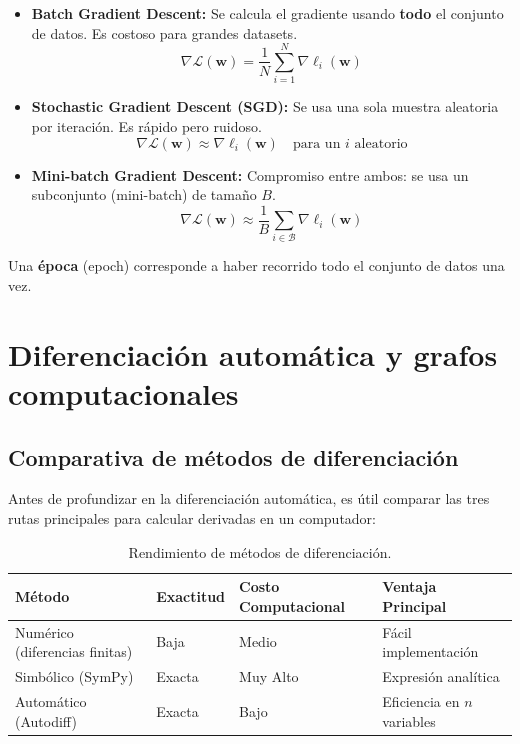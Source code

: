 \documentclass[12pt,a4paper,openany,oneside]{book}
\begin{document}
\begin{itemize}
    \item \textbf{Batch Gradient Descent:} Se calcula el gradiente usando \textbf{todo} el conjunto de datos. Es costoso para grandes datasets.
    \[
    \nabla \mathcal{L}(\mathbf{w}) = \frac{1}{N} \sum_{i=1}^{N} \nabla \ell_i(\mathbf{w})
    \]
    \item \textbf{Stochastic Gradient Descent (SGD):} Se usa una sola muestra aleatoria por iteración. Es rápido pero ruidoso.
    \[
    \nabla \mathcal{L}(\mathbf{w}) \approx \nabla \ell_i(\mathbf{w}) \quad \text{para un } i \text{ aleatorio}
    \]
    \item \textbf{Mini-batch Gradient Descent:} Compromiso entre ambos: se usa un subconjunto (mini-batch) de tamaño $B$.
    \[
    \nabla \mathcal{L}(\mathbf{w}) \approx \frac{1}{B} \sum_{i \in \mathcal{B}} \nabla \ell_i(\mathbf{w})
    \]
\end{itemize}

Una \textbf{época} (epoch) corresponde a haber recorrido todo el conjunto de datos una vez.

\section{Diferenciación automática y grafos computacionales}

\subsection{Comparativa de métodos de diferenciación}
Antes de profundizar en la diferenciación automática, es útil comparar las tres rutas principales para calcular derivadas en un computador:

\begin{table}[h]
\centering
\begin{tabular}{@{}llll@{}}
\toprule
\textbf{Método} & \textbf{Exactitud} & \textbf{Costo Computacional} & \textbf{Ventaja Principal} \\ \midrule
Numérico (diferencias finitas) & Baja & Medio & Fácil implementación \\
Simbólico (SymPy) & Exacta & Muy Alto & Expresión analítica \\
Automático (Autodiff) & Exacta & Bajo & Eficiencia en $n$ variables \\ \bottomrule
\end{tabular}
\caption{Rendimiento de métodos de diferenciación.}
\end{table}
\end{document}

